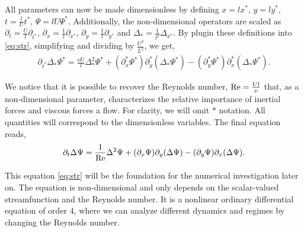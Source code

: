 All parameters can now be made dimensionless by defining $x = l x^*$, $y = l
y^*$, $t = \frac{l}{U} t^*$, $\Psi = lU \Psi^*$. Additionally, the
non-dimensional operators are scaled as $\partial_t = \frac{U}{l}
\partial_{t^*}$, $\partial_x = \frac{1}{l} \partial_{x^*}$, $\partial_y =
\frac{1}{l} \partial_{y^*}$ and $\Delta_* = \frac{1}{l^2} \Delta_{x^*}$. By
plugin these definitions into \eqref{eq:str}, simplifying and dividing by
$\frac{U^2}{L^2}$, we get,
\begin{align}
\partial_{t^*} \Delta_* \Psi^* = \frac{\nu U}{l} \Delta^2_* \Psi^*
  + (\partial_x^* \Psi^*) \partial_y^*(\Delta_* \Psi^*)
  - (\partial_y^* \Psi^*) \partial_x^*(\Delta_* \Psi^*). 
\end{align}

We notice that it is possible to recover the Reynolds number, $\mathrm{Re} =
\frac{Ul}{\nu}$ that, as a non-dimensional parameter, characterizes the
relative importance of inertial forces and viscous forces a flow. For clarity,
we will omit $*$ notation. All quantities will correspond to the dimensionless
variables. The final equation reads,
\vspace{-5pt}
\begin{align}
\partial_t \Delta \Psi = \frac{1}{\mathrm{Re}} \Delta^2 \Psi
  + (\partial_x \Psi) \partial_y(\Delta \Psi)
  - (\partial_y \Psi) \partial_x(\Delta \Psi). \label{eq:str}
\end{align}

This equation \eqref{eq:str} will be the foundation for the numerical
investigation later on. The equation is non-dimensional and only depends on the
scalar-valued streamfunction and the Reynolds number. It is a nonlinear
ordinary differential equation of order 4, where we can analyze different
dynamics and regimes by changing the Reynolds number.

